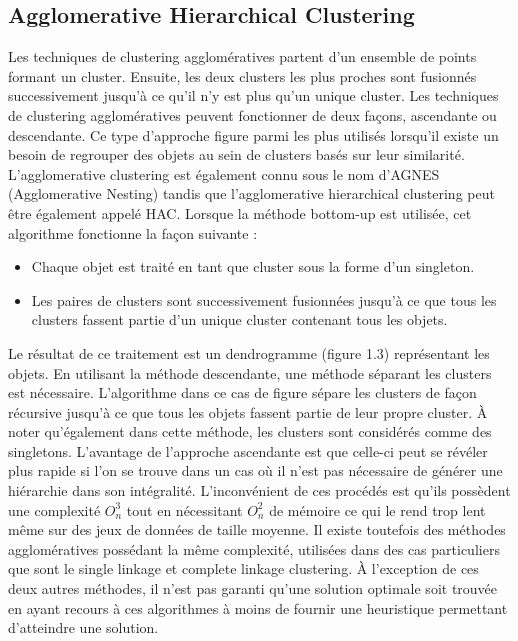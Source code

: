 \documentclass[memoire.tex]{subfiles}
\begin{document}
\subsection{Agglomerative Hierarchical Clustering}

Les techniques de clustering agglomératives partent d'un ensemble de points formant un cluster. Ensuite, les deux clusters les plus proches sont fusionnés successivement jusqu'à ce qu'il n'y est plus qu'un unique cluster. \cite{ref4}
Les techniques de clustering agglomératives peuvent fonctionner de deux façons, ascendante ou descendante. Ce type d’approche figure parmi les plus utilisés lorsqu’il existe un besoin de regrouper des objets au sein de clusters basés sur leur similarité. L’agglomerative clustering est également connu sous le nom d’AGNES (Agglomerative Nesting) tandis que l’agglomerative hierarchical clustering peut être également appelé HAC. Lorsque la méthode bottom-up est utilisée, cet algorithme fonctionne la façon suivante :
\begin{itemize}
\item Chaque objet est traité en tant que cluster sous la forme d’un singleton.
\item Les paires de clusters sont successivement fusionnées jusqu’à ce que tous les clusters fassent partie d’un unique cluster contenant tous les objets.
\end{itemize}
Le résultat de ce traitement est un dendrogramme (figure 1.3) représentant les objets.\cite{ref10} En utilisant la méthode descendante, une méthode séparant les clusters est nécessaire. L’algorithme dans ce cas de figure sépare les clusters de façon récursive jusqu’à ce que tous les objets fassent partie de leur propre cluster. À noter qu’également dans cette méthode, les clusters sont considérés comme des singletons. L’avantage de l’approche ascendante est que celle-ci peut se révéler plus rapide si l’on se trouve dans un cas où il n’est pas nécessaire de générer une hiérarchie dans son intégralité.\cite{ref16}
L’inconvénient de ces procédés est qu’ils possèdent une complexité $O_{n}^3$ tout en nécessitant $O_{n}^2$ de mémoire ce qui le rend trop lent même sur des jeux de données de taille moyenne. Il existe toutefois des méthodes agglomératives possédant la même complexité, utilisées dans des cas particuliers que sont le single linkage et complete linkage clustering. À l’exception de ces deux autres méthodes, il n’est pas garanti qu’une solution optimale soit trouvée en ayant recours à ces algorithmes à moins de fournir une heuristique permettant d’atteindre une solution.
\end{document}
